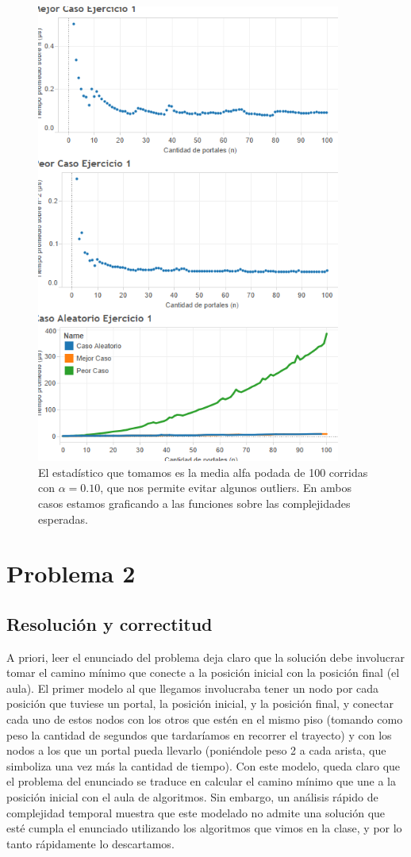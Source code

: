 \documentclass{article}
\theoremstyle{definition}
\theoremstyle{remark}
\begin{document}
\begin{figure}
\centering
\includegraphics[width=10cm]{ex1}
\caption{El estadístico que tomamos es la media alfa podada de 100 corridas con $\alpha = 0.10$, que nos permite evitar algunos outliers. En ambos casos estamos graficando a las funciones sobre las complejidades esperadas. \label{grf:ex1}}
\end{figure}

\pagebreak

\section{Problema 2}

\subsection{Resolución y correctitud}

A priori, leer el enunciado del problema deja claro que la solución debe involucrar tomar el camino mínimo que conecte a la posición inicial con la posición final (el aula). El primer modelo al que llegamos involucraba tener un nodo por cada posición que tuviese un portal, la posición inicial, y la posición final, y conectar cada uno de estos nodos con los otros que estén en el mismo piso (tomando como peso la cantidad de segundos que tardaríamos en recorrer el trayecto) y con los nodos a los que un portal pueda llevarlo (poniéndole peso 2 a cada arista, que simboliza una vez más la cantidad de tiempo). Con este modelo, queda claro que el problema del enunciado se traduce en calcular el camino mínimo que une a la posición inicial con el aula de algoritmos. Sin embargo, un análisis rápido de complejidad temporal muestra que este modelado no admite una solución que esté cumpla el enunciado utilizando los algoritmos que vimos en la clase, y por lo tanto rápidamente lo descartamos.
\end{document}
